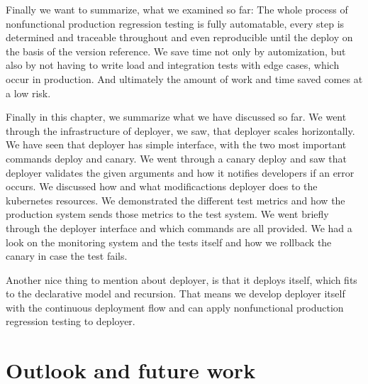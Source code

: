 Finally we want to summarize, what we examined so far: The whole process of nonfunctional
production regression testing is fully automatable, every step is determined and traceable
throughout and even reproducible until the deploy on the basis of the version
reference. We save time not only by automization, but also by not having to write load and
integration tests with edge cases, which occur in production. And ultimately the amount of
work and time saved comes at a low risk.



Finally in this chapter, we summarize what we have discussed so far. We went through the
infrastructure of deployer, we saw, that deployer scales horizontally. We have seen that
deployer has simple interface, with the two most important commands deploy and canary. We
went through a canary deploy and saw that deployer validates the given arguments and how
it notifies developers if an error occurs. We discussed how and what modificactions
deployer does to the kubernetes resources. We demonstrated the different test metrics and
how the production system sends those metrics to the test system. We went briefly through
the deployer interface and which commands are all provided. We had a look on the
monitoring system and the tests itself and how we rollback the canary in case the test
fails.

Another nice thing to mention about deployer, is that it deploys itself, which fits to the
declarative model and recursion. That means we develop deployer itself with the continuous
deployment flow and can apply nonfunctional production regression testing to deployer.



\section{Outlook and future work}





